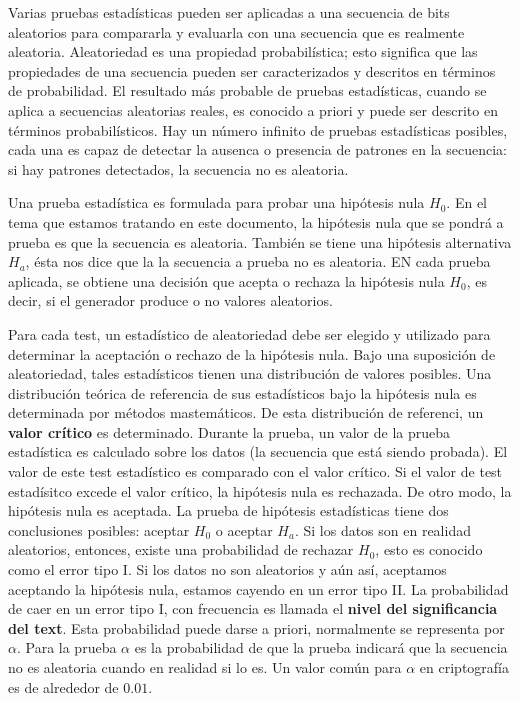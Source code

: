 \documentclass{llncs}
\theoremstyle{plane}
\begin{document}
Varias pruebas estadísticas pueden ser aplicadas a una secuencia de bits aleatorios para compararla y evaluarla con una secuencia que es realmente aleatoria. Aleatoriedad es una propiedad probabilística; esto significa que las propiedades de una secuencia pueden ser caracterizados y descritos en términos de probabilidad. 
El resultado más probable de pruebas estadísticas, cuando se aplica a secuencias aleatorias reales, es conocido a priori y puede ser descrito  en términos probabilísticos. Hay un número infinito de pruebas estadísticas posibles, cada una es capaz de detectar la ausenca o presencia de patrones en la secuencia: si hay patrones detectados, la secuencia no es aleatoria.


Una prueba estadística es formulada para probar una hipótesis nula $H_{0}$. En el tema que estamos tratando en este documento, la hipótesis nula que se pondrá a prueba es que la secuencia es aleatoria. También se tiene una hipótesis alternativa $H_{a}$, ésta nos dice que la la secuencia a prueba no es aleatoria. EN cada prueba aplicada, se obtiene una decisión que acepta o rechaza la hipótesis nula $H_{0}$, es decir, si el generador produce o no valores aleatorios. 

Para cada test, un estadístico de aleatoriedad debe ser elegido y utilizado para determinar la aceptación o rechazo de la hipótesis nula. Bajo una suposición de aleatoriedad, tales estadísticos tienen una distribución de valores posibles. Una distribución teórica de referencia de sus estadísticos bajo la hipótesis nula es determinada por métodos mastemáticos. De esta distribución de referenci, un \textbf{valor crítico} es determinado. Durante la prueba, un valor de la prueba estadística es calculado sobre los datos (la secuencia que está siendo probada). El valor de este test estadístico es comparado con el valor crítico. Si el valor de test estadísitco excede el valor crítico, la hipótesis nula es rechazada. De otro modo, la hipótesis nula es aceptada.
La prueba de hipótesis estadísticas tiene dos conclusiones posibles: aceptar $H_{0}$ o aceptar $H_{a}$. Si los datos son en realidad aleatorios, entonces, existe una probabilidad de rechazar $H_{0}$, esto es conocido como el error tipo I. Si los datos no son aleatorios y aún así, aceptamos aceptando la hipótesis nula, estamos cayendo en un error tipo II.
La probabilidad de caer en un error tipo I, con frecuencia es llamada el \textbf{nivel del significancia del text}. Esta probabilidad puede darse a priori, normalmente se representa por $\alpha$. Para la prueba $\alpha$ es la probabilidad de que la prueba indicará que la secuencia no es aleatoria cuando en realidad si lo es. Un valor común para $\alpha$ en criptografía es de alrededor de $0.01$.
\end{document}
